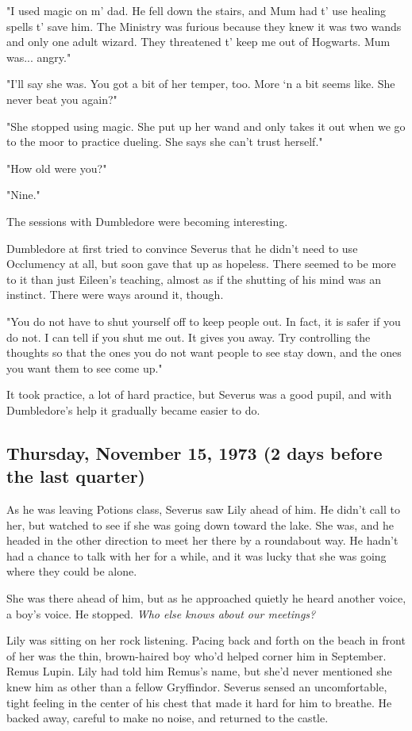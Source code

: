 "I used magic on m' dad. He fell down the stairs, and Mum had t' use healing spells t' save him. The Ministry was furious because they knew it was two wands and only one adult wizard. They threatened t' keep me out of Hogwarts. Mum was... angry."

"I'll say she was. You got a bit of her temper, too. More `n a bit seems like. She never beat you again?"

"She stopped using magic. She put up her wand and only takes it out when we go to the moor to practice dueling. She says she can't trust herself."

"How old were you?"

"Nine."

The sessions with Dumbledore were becoming interesting.

Dumbledore at first tried to convince Severus that he didn't need to use Occlumency at all, but soon gave that up as hopeless. There seemed to be more to it than just Eileen's teaching, almost as if the shutting of his mind was an instinct. There were ways around it, though.

"You do not have to shut yourself off to keep people out. In fact, it is safer if you do not. I can tell if you shut me out. It gives you away. Try controlling the thoughts so that the ones you do not want people to see stay down, and the ones you want them to see come up."

It took practice, a lot of hard practice, but Severus was a good pupil, and with Dumbledore's help it gradually became easier to do.

\subsection{Thursday, November 15, 1973 (2 days before the last quarter)}

As he was leaving Potions class, Severus saw Lily ahead of him. He didn't call to her, but watched to see if she was going down toward the lake. She was, and he headed in the other direction to meet her there by a roundabout way. He hadn't had a chance to talk with her for a while, and it was lucky that she was going where they could be alone.

She was there ahead of him, but as he approached quietly he heard another voice, a boy's voice. He stopped. \emph{Who else knows about our meetings?}

Lily was sitting on her rock listening. Pacing back and forth on the beach in front of her was the thin, brown-haired boy who'd helped corner him in September. Remus Lupin. Lily had told him Remus's name, but she'd never mentioned she knew him as other than a fellow Gryffindor. Severus sensed an uncomfortable, tight feeling in the center of his chest that made it hard for him to breathe. He backed away, careful to make no noise, and returned to the castle.

